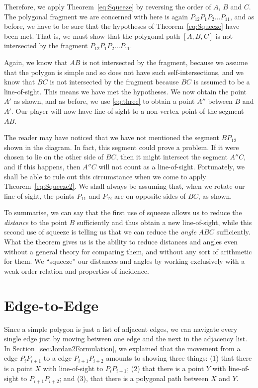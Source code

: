 Therefore, we apply Theorem~\ref{eq:Squeeze} by reversing the order of $A$, $B$ and $C$. The polygonal fragment we are concerned with here is again $P_{12}P_1P_2\ldots P_{11}$, and as before, we have to be sure that the hypotheses of Theorem~\ref{eq:Squeeze} have been met. That is, we must show that the polygonal path $[A,B,C]$ is not intersected by the fragment $P_{12}P_1P_2\ldots P_{11}$. 

Again, we know that $AB$ is not intersected by the fragment, because we assume that the polygon is simple and so does not have such self-intersections, and we know that $BC$ is not intersected by the fragment because $BC$ is assumed to be a line-of-sight. This means we have met the hypotheses. We now obtain the point $A'$ as shown, and as before, we use \ref{eq:three} to obtain a point $A''$ between $B$ and $A'$. Our player will now have line-of-sight to a non-vertex point of the segment $AB$.

The reader may have noticed that we have not mentioned the segment $BP_{12}$ shown in the diagram. In fact, this segment could prove a problem. If it were chosen to lie on the other side of $BC$, then it might intersect the segment $A''C$, and if this happens, then $A''C$ will not count as a line-of-sight. Fortunately, we shall be able to rule out this circumstance when we come to apply Theorem~\ref{eq:Squeeze2}. We shall always be assuming that, when we rotate our line-of-sight, the points $P_{11}$ and $P_{12}$ are on opposite sides of $BC$, as shown.

To summarise, we can say that the first use of squeeze allows us to reduce the \emph{distance} to the point $B$ sufficiently and thus obtain a new line-of-sight, while this second use of squeeze is telling us that we can reduce the \emph{angle} $ABC$ sufficiently. What the theorem gives us is the ability to reduce distances and angles even without a general theory for comparing them, and without any sort of arithmetic for them. We ``squeeze'' our distances and angles by working exclusively with a weak order relation and properties of incidence.

\section{Edge-to-Edge}\label{sec:NavigationVerification}
Since a simple polygon is just a list of adjacent edges, we can navigate every single edge just by moving between one edge and the next in the adjacency list. In Section~\ref{sec:Jordan2Formulation}, we explained that the movement from a edge $P_{i}P_{i+1}$ to a edge $P_{i+1}P_{i+2}$ amounts to showing three things: (1) that there is a point $X$ with line-of-sight to $P_{i}P_{i+1}$; (2) that there is a point $Y$ with line-of-sight to $P_{i+1}P_{i+2}$; and (3), that there is a polygonal path between $X$ and $Y$.

